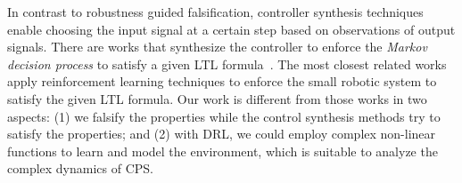 In contrast to robustness guided falsification,
controller synthesis techniques enable choosing the input signal at a certain step based on observations of output signals.
There are works that synthesize the controller to enforce the \emph{Markov decision process}
to satisfy a given LTL formula~\cite{DBLP:conf/cdc/SadighKCSS14,DBLP:conf/wafr/LunaLMK14,DBLP:journals/tac/DingSBR14,DBLP:conf/hybrid/SoudjaniM17,DBLP:conf/cdc/DingSBR11}.
The most closest related works~\cite{DBLP:conf/iros/LiVB17,DBLP:journals/corr/abs-1709-09611}
apply reinforcement learning techniques to enforce the small robotic system to satisfy the given LTL formula.
Our work is different from those works in two aspects: (1) we falsify the properties while the control synthesis methods try to satisfy the properties; and
(2) with DRL, we could employ complex non-linear functions to learn and model the environment, which is suitable to analyze the complex dynamics of CPS.
